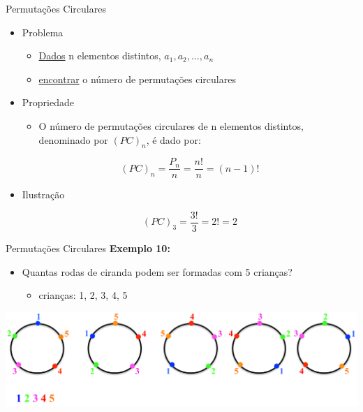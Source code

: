 \documentclass[aspectratio=169]{beamer}
\begin{document}
\begin{frame}{Permutações Circulares}
    \begin{itemize}
        \item Problema
        \begin{itemize}
            \item[] \underline{Dados} n elementos distintos, $a_1, a_2, \ldots, a_n$
            \item[] \underline{encontrar} o número de permutações circulares
        \end{itemize}

        \item Propriedade
        \begin{itemize}
            \item[] O número de permutações circulares de n elementos distintos, denominado por $(PC)_n$, é dado por:
        \end{itemize}

        $$ (PC)_n = \frac{P_n}{n} = \frac{n!}{n} = (n-1)! $$

        \item Ilustração
        
        $$ (PC)_3 = \frac{3!}{3} = 2! = 2 $$
    \end{itemize}

\end{frame}

\begin{frame}{Permutações Circulares}
    \textbf{Exemplo 10:}

    \vspace{2mm}

    \begin{itemize}
        \item[] Quantas rodas de ciranda podem ser formadas com 5 crianças?
        
        \begin{itemize}
            \item crianças: 1, 2, 3, 4, 5
        \end{itemize}
    \end{itemize}

    \begin{center}
        \includegraphics[width=0.8\linewidth]{figs/exemplo10.png}
    \end{center}

\end{frame}
\end{document}
